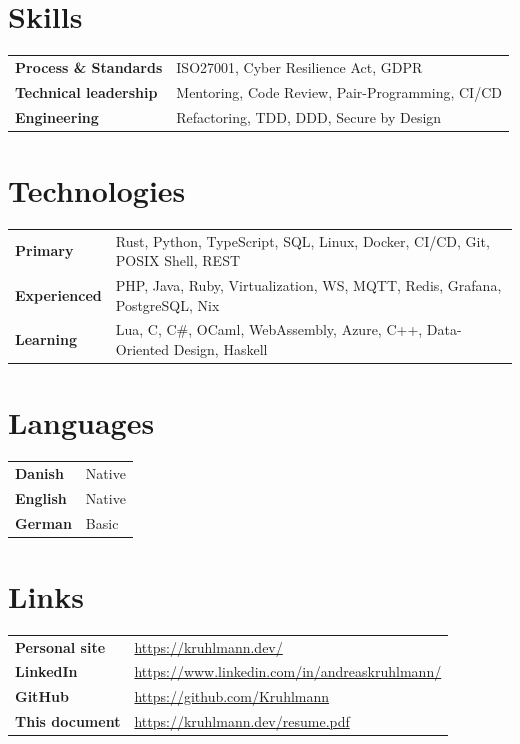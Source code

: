 \documentclass[a4paper,10pt]{article}
\begin{document}
\section{Skills}
\begin{tabular}{@{}p{3.4cm}p{12.9cm}@{}}
	\textbf{Process \& Standards} & ISO27001, Cyber Resilience Act, GDPR            \\
	\textbf{Technical leadership} & Mentoring, Code Review, Pair-Programming, CI/CD \\
	\textbf{Engineering}          & Refactoring, TDD, DDD, Secure by Design
\end{tabular}

\section{Technologies}
\begin{tabular}{@{}p{3.4cm}p{12.9cm}@{}}
	\textbf{Primary}     & Rust, Python, TypeScript, SQL, Linux, Docker, CI/CD, Git, POSIX Shell, REST \\
	\textbf{Experienced} & PHP, Java, Ruby, Virtualization, WS, MQTT, Redis, Grafana, PostgreSQL, Nix  \\
	\textbf{Learning}    & Lua, C, C\#, OCaml, WebAssembly, Azure, C++, Data-Oriented Design, Haskell
\end{tabular}

\section{Languages}
\begin{tabular}{@{}p{3.4cm}p{12.9cm}@{}}
	\textbf{Danish}  & Native \\
	\textbf{English} & Native \\
	\textbf{German}  & Basic  \\
\end{tabular}

\section{Links}
\begin{tabular}{@{}p{3.4cm}p{12.9cm}@{}}
	\textbf{Personal site} & \href{https://kruhlmann.dev/}{https://kruhlmann.dev/}                                               \\
	\textbf{LinkedIn}      & \href{https://www.linkedin.com/in/andreaskruhlmann/}{https://www.linkedin.com/in/andreaskruhlmann/} \\
	\textbf{GitHub}        & \href{https://github.com/Kruhlmann}{https://github.com/Kruhlmann}                                   \\
	\textbf{This document} & \href{https://kruhlmann.dev/resume.pdf}{https://kruhlmann.dev/resume.pdf}
\end{tabular}
\end{document}
